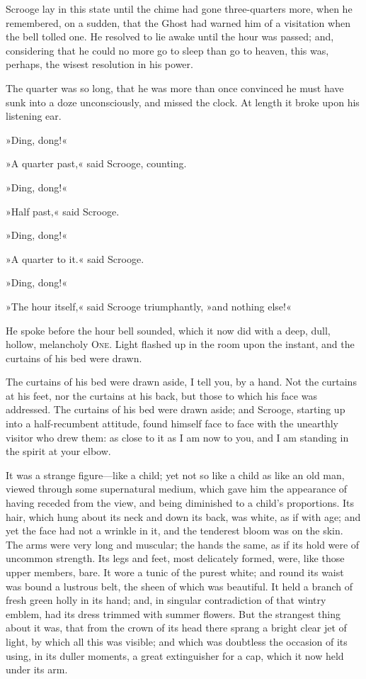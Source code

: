 Scrooge lay in this state until the chime had gone three-quarters more, when he remembered, on a sudden, that the Ghost had warned him of a visitation when the bell tolled one. He resolved to lie awake until the hour was passed; and, considering that he could no more go to sleep than go to heaven, this was, perhaps, the wisest resolution in his power.

The quarter was so long, that he was more than once convinced he must have sunk into a doze unconsciously, and missed the clock. At length it broke upon his listening ear.

»Ding, dong!«

»A quarter past,« said Scrooge, counting.

»Ding, dong!«

»Half past,« said Scrooge.

»Ding, dong!«

»A quarter to it.« said Scrooge.

»Ding, dong!«

»The hour itself,« said Scrooge triumphantly, »and nothing else!«

He spoke before the hour bell sounded, which it now did with a deep, dull, hollow, melancholy \textsc{One}. Light flashed up in the room upon the instant, and the curtains of his bed were drawn.

The curtains of his bed were drawn aside, I tell you, by a hand. Not the curtains at his feet, nor the curtains at his back, but those to which his face was addressed. The curtains of his bed were drawn aside; and Scrooge, starting up into a half-recumbent attitude, found himself face to face with the unearthly visitor who drew them: as close to it as I am now to you, and I am standing in the spirit at your elbow.

It was a strange figure---like a child; yet not so like a child as like an old man, viewed through some supernatural medium, which gave him the appearance of having receded from the view, and being diminished to a child's proportions. Its hair, which hung about its neck and down its back, was white, as if with age; and yet the face had not a wrinkle in it, and the tenderest bloom was on the skin. The arms were very long and muscular; the hands the same, as if its hold were of uncommon strength. Its legs and feet, most delicately formed, were, like those upper members, bare. It wore a tunic of the purest white; and round its waist was bound a lustrous belt, the sheen of which was beautiful. It held a branch of fresh green holly in its hand; and, in singular contradiction of that wintry emblem, had its dress trimmed with summer flowers. But the strangest thing about it was, that from the crown of its head there sprang a bright clear jet of light, by which all this was visible; and which was doubtless the occasion of its using, in its duller moments, a great extinguisher for a cap, which it now held under its arm.

